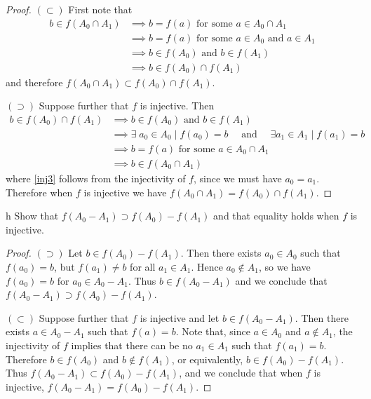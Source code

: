 \documentclass[11pt]{article}
\begin{document}
\begin{proof}
  $(\subset)$ First note that
  \begin{align}
    b \in f(A_0 \cap A_1)
      &\implies b = f(a) \text{ for some } a \in A_0 \cap A_1 \label{im3} \\
      &\implies b = f(a) \text{ for some } a \in A_0 \text{ and } a \in A_1 \label{in1} \\
      &\implies b \in f(A_0) \text{ and } b \in f(A_1) \label{im4} \\
      &\implies b \in f(A_0) \cap f(A_1) \label{in2}
  \end{align}
  and therefore $f(A_0 \cap A_1) \subset f(A_0) \cap f(A_1)$.

  $(\supset)$ Suppose further that $f$ is injective. Then
  \begin{align}
    b \in f(A_0) \cap f(A_1)
      &\implies b \in f(A_0) \text{ and } b \in f(A_1) \nonumber \\
      &\implies
        \exists\; a_0 \in A_0 \mid f(a_0) = b
        \quad \text{ and } \quad
        \exists a_1 \in A_1 \mid f(a_1) = b \nonumber \\
      &\implies b = f(a) \text{ for some } a \in A_0 \cap A_1 \label{inj3} \\
      &\implies b \in f(A_0 \cap A_1) \label{im6} \nonumber
  \end{align}
  where \eqref{inj3} follows from the injectivity of $f$, since we must have
  $a_0 = a_1$. Therefore when $f$ is injective we have $f(A_0 \cap A_1) =
  f(A_0) \cap f(A_1)$.
\end{proof}

\begin{p}{h}
  Show that $f(A_0 - A_1) \supset f(A_0) - f(A_1)$ and that equality holds when
  $f$ is injective.
\end{p}

\begin{proof}
  $(\supset)$ Let $b \in f(A_0) - f(A_1)$. Then there exists $a_0 \in A_0$ such that $f(a_0) = b$, but $f(a_1) \neq b$ for all $a_1 \in A_1$. Hence $a_0 \notin A_1$, so we have $f(a_0) = b$ for $a_0 \in A_0 - A_1$. Thus $b \in f(A_0 - A_1)$ and we conclude that $f(A_0 - A_1) \supset f(A_0) - f(A_1)$.

  $(\subset)$ Suppose further that $f$ is injective and let $b \in f(A_0 -
  A_1)$. Then there exists $a \in A_0 - A_1$ such that $f(a) = b$. Note that,
  since $a \in A_0$ and $a \notin A_1$, the injectivity of $f$ implies that
  there can be no $a_1 \in A_1$ such that $f(a_1) = b$. Therefore $b \in
  f(A_0)$ and $b \notin f(A_1)$, or equivalently, $b \in f(A_0) - f(A_1)$. Thus
  $f(A_0 - A_1) \subset f(A_0) - f(A_1)$, and we conclude that when $f$ is
  injective, $f(A_0 - A_1) = f(A_0) - f(A_1)$.
\end{proof}
\end{document}
